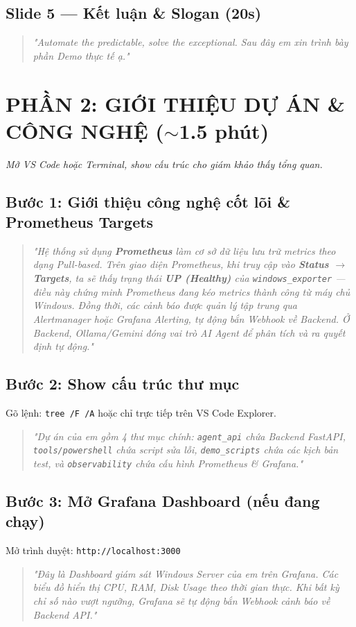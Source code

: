 \documentclass[12pt,a4paper]{article}
\begin{document}
\subsection{Slide 5 — Kết luận \& Slogan (20s)}
\begin{quote}
    \textit{"Automate the predictable, solve the exceptional. Sau đây em xin trình bày phần Demo thực tế ạ."}
\end{quote}

\newpage

\section{PHẦN 2: GIỚI THIỆU DỰ ÁN \& CÔNG NGHỆ ($\sim$1.5 phút)}

\textit{Mở VS Code hoặc Terminal, show cấu trúc cho giám khảo thấy tổng quan.}

\subsection{Bước 1: Giới thiệu công nghệ cốt lõi \& Prometheus Targets}
\begin{quote}
    \textit{"Hệ thống sử dụng \textbf{Prometheus} làm cơ sở dữ liệu lưu trữ metrics theo dạng Pull-based. Trên giao diện Prometheus, khi truy cập vào \textbf{Status $\rightarrow$ Targets}, ta sẽ thấy trạng thái \textbf{UP (Healthy)} của \texttt{windows\_exporter} — điều này chứng minh Prometheus đang kéo metrics thành công từ máy chủ Windows. Đồng thời, các cảnh báo được quản lý tập trung qua Alertmanager hoặc Grafana Alerting, tự động bắn Webhook về Backend. Ở Backend, Ollama/Gemini đóng vai trò AI Agent để phân tích và ra quyết định tự động."}
\end{quote}

\subsection{Bước 2: Show cấu trúc thư mục}
Gõ lệnh: \texttt{tree /F /A} hoặc chỉ trực tiếp trên VS Code Explorer.
\begin{quote}
    \textit{"Dự án của em gồm 4 thư mục chính: \texttt{agent\_api} chứa Backend FastAPI, \texttt{tools/powershell} chứa script sửa lỗi, \texttt{demo\_scripts} chứa các kịch bản test, và \texttt{observability} chứa cấu hình Prometheus \& Grafana."}
\end{quote}

\subsection{Bước 3: Mở Grafana Dashboard (nếu đang chạy)}
Mở trình duyệt: \texttt{http://localhost:3000}
\begin{quote}
    \textit{"Đây là Dashboard giám sát Windows Server của em trên Grafana. Các biểu đồ hiển thị CPU, RAM, Disk Usage theo thời gian thực. Khi bất kỳ chỉ số nào vượt ngưỡng, Grafana sẽ tự động bắn Webhook cảnh báo về Backend API."}
\end{quote}
\end{document}
